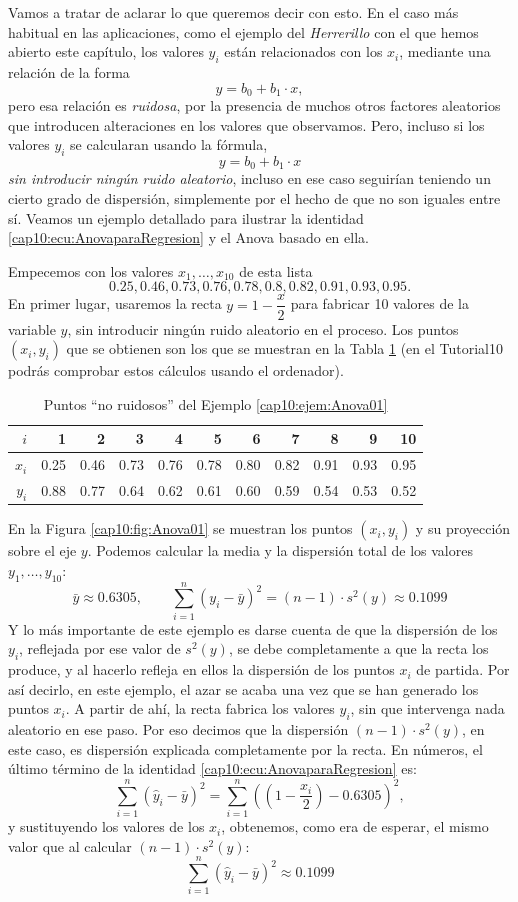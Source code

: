 Vamos a tratar de aclarar lo que queremos decir con esto. En el caso más habitual en las aplicaciones, como el ejemplo del {\em Herrerillo} con el que hemos abierto este capítulo, los valores $y_i$ están relacionados con los $x_i$, mediante una relación de la forma
\[y=b_0+b_1\cdot x,\]
pero esa relación es {\em ruidosa}, por la presencia de muchos otros factores aleatorios que introducen alteraciones en los valores que observamos. Pero, incluso si los valores $y_i$ se calcularan usando la fórmula,
\[y=b_0+b_1\cdot x\]
{\em sin introducir ningún ruido aleatorio}, incluso en ese caso seguirían teniendo un cierto grado de dispersión, simplemente por el hecho de que no son iguales entre sí. Veamos un ejemplo detallado para ilustrar la identidad \ref{cap10:ecu:AnovaparaRegresion} y el Anova basado en ella.

\begin{ejemplo}
\label{cap10:ejem:Anova01}
Empecemos con los valores $x_1,\ldots,x_{10}$ de esta lista
\[0.25, 0.46, 0.73, 0.76, 0.78, 0.8, 0.82, 0.91, 0.93, 0.95.\]
En primer lugar, usaremos la recta $y=1-\dfrac{x}{2}$ para fabricar 10 valores de la variable $y$, {\sf sin introducir ningún ruido aleatorio en el proceso}. Los puntos $(x_i,y_i)$ que se obtienen son los que se muestran en la  Tabla \ref{cap10:tabla:Anova01noruidosos} (en el Tutorial10 podrás comprobar estos cálculos usando el ordenador).
\begin{table}[htb]
\centering
\begin{tabular}{rrrrrrrrrrr}
  \hline
$i$ & 1 & 2 & 3 & 4 & 5 & 6 & 7 & 8 & 9 & 10 \\
  \hline
$x_i$ & 0.25 & 0.46 & 0.73 & 0.76 & 0.78 & 0.80 & 0.82 & 0.91 & 0.93 & 0.95 \\
$y_i$ & 0.88 & 0.77 & 0.64 & 0.62 & 0.61 & 0.60 & 0.59 & 0.54 & 0.53 & 0.52 \\
   \hline
\end{tabular}
\caption{Puntos ``no ruidosos'' del Ejemplo \ref{cap10:ejem:Anova01}}
\label{cap10:tabla:Anova01noruidosos}
\end{table}
En la Figura \ref{cap10:fig:Anova01} se muestran los puntos $(x_i,y_i)$ y su proyección sobre el eje $y$. Podemos calcular la media y la dispersión total de los valores $y_1,\ldots,y_{10}$:
\[\bar y\approx 0.6305, \qquad \displaystyle\sum_{i=1}^{n}(y_i-\bar y)^2=(n-1)\cdot s^2(y)\approx 0.1099\]
Y lo más importante de este ejemplo es darse cuenta de que la dispersión de los $y_i$, reflejada por ese valor de $s^2(y)$, se debe {\sf completamente} a que la recta los produce, y al hacerlo  refleja en ellos la dispersión de los puntos $x_i$ de partida. Por así decirlo, en este ejemplo, el azar se acaba una vez que se han generado los puntos $x_i$. A partir de ahí, la recta fabrica los valores $y_i$, sin que intervenga nada aleatorio en ese paso. Por eso decimos que la dispersión $(n-1)\cdot s^2(y)$, en este caso, es dispersión explicada completamente por la recta. En números, el último término de la identidad \ref{cap10:ecu:AnovaparaRegresion} es:
\[\sum_{i=1}^n(\hat y_i-\bar y)^2=\sum_{i=1}^n\left((1-\dfrac{x_i}{2})-0.6305\right)^2,\]
y sustituyendo los valores de los $x_i$, obtenemos, como era de esperar, el mismo valor que al calcular $(n-1)\cdot s^2(y)$:
\[\sum_{i=1}^n(\hat y_i-\bar y)^2\approx 0.1099\]


\end{ejemplo}
